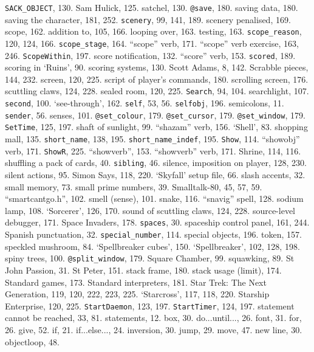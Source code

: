 {{\tt SACK\_OBJECT}}, 130.
Sam Hulick, 125.
satchel, 130.
{{\tt @save}}, 180.
saving data, 180.
saving the character, 181, 252.
{{\tt scenery}}, 99, 141, 189.
scenery penalised, 169.
scope, 162.
\quad  addition to, 105, 166.
\quad  looping over, 163.
\quad  testing, 163.
{{\tt scope\_reason}}, 120, 124, 166.
{{\tt scope\_stage}}, 164.
``scope'' verb, 171.
``scope'' verb exercise, 163, 246.
{{\tt ScopeWithin}}, 197.
score notification, 132.
``score'' verb, 153.
{{\tt scored}}, 189.
scoring in `Ruins', 90.
scoring systems, 130.
Scott Adams, 8, 142.
Scrabble pieces, 144, 232.
screen, 120, 225.
script of player's commands, 180.
scrolling screen, 176.
scuttling claws, 124, 228.
sealed room, 120, 225.
{{\tt Search}}, 94, 104.
searchlight, 107.
{{\tt second}}, 100.
`see-through', 162.
{{\tt self}}, 53, 56.
{{\tt selfobj}}, 196.
semicolons, 11.
{{\tt sender}}, 56.
senses, 101.
{{\tt @set\_colour}}, 179.
{{\tt @set\_cursor}}, 179.
{{\tt @set\_window}}, 179.
{{\tt SetTime}}, 125, 197.
shaft of sunlight, 99.
``shazam'' verb, 156.
`Shell', 83.
shopping mall, 135.
{{\tt short\_name}}, 138, 195.
{{\tt short\_name\_indef}}, 195.
{{\tt Show}}, 114.
``showobj'' verb, 171.
{{\tt ShowR}}, 225.
``showverb'', 153.
``showverb'' verb, 171.
Shrine, 114, 116.
shuffling a pack of cards, 40.
{{\tt sibling}}, 46.
silence, imposition on player, 128, 230.
silent actions, 95.
Simon Says, 118, 220.
`Skyfall' setup file, 66.
slash accents, 32.
small memory, 73.
small prime numbers, 39.
Smalltalk-80, 45, 57, 59.
``smartcantgo.h'', 102.
smell (sense), 101.
snake, 116.
``snavig'' spell, 128.
sodium lamp, 108.
`Sorcerer', 126, 170.
sound of scuttling claws, 124, 228.
source-level debugger, 171.
Space Invaders, 178.
{{\tt spaces}}, 30.
spaceship control panel, 161, 244.
Spanish punctuation, 32.
{{\tt special\_number}}, 114.
special objects, 196.
 token, 157.
speckled mushroom, 84.
`Spellbreaker cubes', 150.
`Spellbreaker', 102, 128, 198.
spiny trees, 100.
{{\tt @split\_window}}, 179.
Square Chamber, 99.
squawking, 89.
St John Passion, 31.
St Peter, 151.
stack frame, 180.
stack usage (limit), 174.
Standard games, 173.
Standard interpreters, 181.
Star Trek: The Next Generation, 119, 120, 222, 223, 225.
`Starcross', 117, 118, 220.
Starship Enterprise, 120, 225.
{{\tt StartDaemon}}, 123, 197.
{{\tt StartTimer}}, 124, 197.
statement cannot be reached, 33, 81.
statements, 12.
\quad  box, 30.
\quad  do...until..., 26.
\quad  font, 31.
\quad  for, 26.
\quad  give, 52.
\quad  if, 21.
\quad  if...else..., 24.
\quad  inversion, 30.
\quad  jump, 29.
\quad  move, 47.
\quad  new line, 30.
\quad  objectloop, 48.
